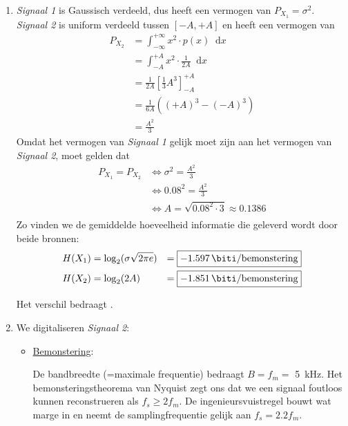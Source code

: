 \documentclass[kulak]{kulakarticle}
\newcommand*\diff{\mathop{}\!\mathrm{d}}
\begin{document}
	\begin{enumerate}
		\item \textit{Signaal 1} is Gaussisch verdeeld, dus heeft een vermogen van \( P_{{X_1}} = \sigma^2 \).
		\textit{Signaal 2} is uniform verdeeld tussen \( [-A,+A] \) en heeft een vermogen van
		\begin{equation*}
			\begin{split}
				P_{{X_2}} & = \int_{-\infty}^{+\infty}x^2\cdot p(x) \diff{x} \\
				       & = \int_{-A}^{+A}x^2\cdot \frac{1}{2A} \diff{x} \\
				       & = \frac{1}{2A} \left[\frac{1}{3}A^3\right]^{+A}_{-A} \\
				       & = \frac{1}{6A} \left((+A)^3-(-A)^3\right) \\
				       & = \frac{A^2}{3}
			\end{split}
		\end{equation*}
		Omdat het vermogen van \textit{Signaal 1} gelijk moet zijn aan het vermogen van \textit{Signaal 2}, moet gelden dat
		\begin{equation*}
			\begin{split}
				P_{{X_1}} = P_{{X_2}} & \Leftrightarrow \sigma^2 = \frac{A^2}{3} \\
				& \Leftrightarrow 0.08^2 = \frac{A^2}{3} \\
				& \Leftrightarrow A = \sqrt{0.08^2\cdot 3} \approx 0.1386 \\
			\end{split}
		\end{equation*}
		Zo vinden we de gemiddelde hoeveelheid informatie die geleverd wordt door beide bronnen:
		\begin{align*}
			&H(X_1) = \log_2({\sigma\sqrt{2\pi e}}) &= \boxed{\SI{-1.597}{\biti \per bemonstering}} \\
			&H(X_2) = \log_2({2A}) &= \boxed{\SI{-1.851}{\biti \per bemonstering}}
		\end{align*}

		Het verschil bedraagt .

		\newpage

		\item We digitaliseren \textit{Signaal 2}:
		\begin{itemize}
			\item \underline{Bemonstering}:

			De bandbreedte (=maximale frequentie) bedraagt \( B =f_m= \) \SI{5}{\kilo\hertz}. Het bemonsteringstheorema van Nyquist zegt ons dat we een signaal foutloos kunnen reconstrueren als \( f_s \geq 2f_m \). De ingenieursvuistregel bouwt wat marge in en neemt de samplingfrequentie gelijk aan \( f_s=2.2f_m \).


\end{itemize}
\end{enumerate}
\end{document}
